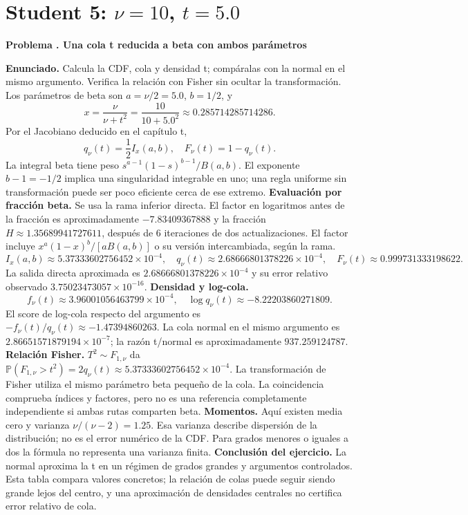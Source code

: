 \documentclass[11pt,a4paper]{article}
\newcommand{\Prob}{\mathbb P}
\theoremstyle{definition}
\newcounter{problema}
\newenvironment{resuelto}[1]{\refstepcounter{problema}\par\medskip\Needspace{6\baselineskip}\textbf{Problema \theproblema. #1}\par}{\par\medskip}
\begin{document}
\section{\texorpdfstring{Student 5: $\nu=10$, $t=5.0$}{Student 5: nu=10, t=5.0}}
\begin{resuelto}{Una cola t reducida a beta con ambos parámetros}
\textbf{Enunciado.} Calcula la CDF, cola y densidad t; compáralas con la normal en el mismo argumento. Verifica la relación con Fisher sin ocultar la transformación.
Los parámetros de beta son $a=\nu/2=5.0$, $b=1/2$, y
\[
x=\frac{\nu}{\nu+t^2}=\frac{10}{10+5.0^2}\approx0.285714285714286.
\]
Por el Jacobiano deducido en el capítulo t,
\[
q_\nu(t)=\frac12 I_x(a,b),\quad F_\nu(t)=1-q_\nu(t).
\]
La integral beta tiene peso $s^{a-1}(1-s)^{b-1}/B(a,b)$. El exponente $b-1=-1/2$ implica una singularidad integrable en uno; una regla uniforme sin transformación puede ser poco eficiente cerca de ese extremo.
\textbf{Evaluación por fracción beta.} Se usa la rama inferior directa. El factor en logaritmos antes de la fracción es aproximadamente $-7.83409367888$ y la fracción $H\approx1.35689941727611$, después de 6 iteraciones de dos actualizaciones. El factor incluye $x^a(1-x)^b/[aB(a,b)]$ o su versión intercambiada, según la rama.
\[
I_x(a,b)\approx5.37333602756452\times10^{-4},\quad q_\nu(t)\approx2.68666801378226\times10^{-4},\quad F_\nu(t)\approx0.999731333198622.
\]
La salida directa aproximada es $2.68666801378226\times10^{-4}$ y su error relativo observado $3.75023473057\times10^{-16}$.
\textbf{Densidad y log-cola.}
\[
f_\nu(t)\approx3.96001056463799\times10^{-4},\quad
\log q_\nu(t)\approx-8.22203860271809.
\]
El score de log-cola respecto del argumento es $-f_\nu(t)/q_\nu(t)\approx-1.47394860263$. La cola normal en el mismo argumento es $2.86651571879194\times10^{-7}$; la razón t/normal es aproximadamente $937.259124787$.
\textbf{Relación Fisher.} $T^2\sim F_{1,\nu}$ da $\Prob(F_{1,\nu}>t^2)=2q_\nu(t)\approx5.37333602756452\times10^{-4}$. La transformación de Fisher utiliza el mismo parámetro beta pequeño de la cola. La coincidencia comprueba índices y factores, pero no es una referencia completamente independiente si ambas rutas comparten beta.
\textbf{Momentos.} Aquí existen media cero y varianza $\nu/(\nu-2)=1.25$. Esa varianza describe dispersión de la distribución; no es el error numérico de la CDF. Para grados menores o iguales a dos la fórmula no representa una varianza finita.
\textbf{Conclusión del ejercicio.} La normal aproxima la t en un régimen de grados grandes y argumentos controlados. Esta tabla compara valores concretos; la relación de colas puede seguir siendo grande lejos del centro, y una aproximación de densidades centrales no certifica error relativo de cola.
\end{resuelto}
\end{document}
